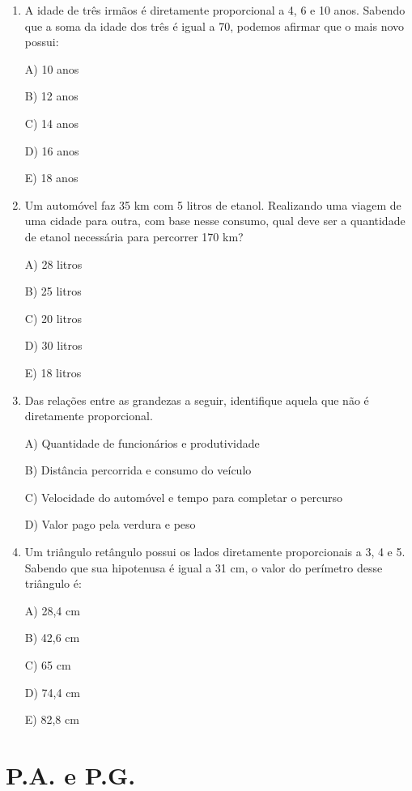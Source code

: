 \begin{multicols*}{2}
\begin{enumerate}
        \item A idade de três irmãos é diretamente proporcional a 4, 6 e 10 anos. Sabendo que a soma da idade dos três é igual a 70, podemos afirmar que o mais novo possui:

              A) 10 anos

              B) 12 anos

              C) 14 anos

              D) 16 anos

              E) 18 anos

        \item Um automóvel faz 35 km com 5 litros de etanol. Realizando uma viagem de uma cidade para outra, com base nesse consumo, qual deve ser a quantidade de etanol necessária para percorrer 170 km?

              A) 28 litros

              B) 25 litros

              C) 20 litros

              D) 30 litros

              E) 18 litros

        \item Das relações entre as grandezas a seguir, identifique aquela que não é diretamente proporcional.

              A) Quantidade de funcionários e produtividade

              B) Distância percorrida e consumo do veículo

              C) Velocidade do automóvel e tempo para completar o percurso

              D) Valor pago pela verdura e peso

        \item Um triângulo retângulo possui os lados diretamente proporcionais a 3, 4 e 5. Sabendo que sua hipotenusa é igual a 31 cm, o valor do perímetro desse triângulo é:

              A) 28,4 cm

              B) 42,6 cm

              C) 65 cm

              D) 74,4 cm

              E) 82,8 cm

    \end{enumerate}

    \section*{P.A. e P.G.}


\end{multicols*}
